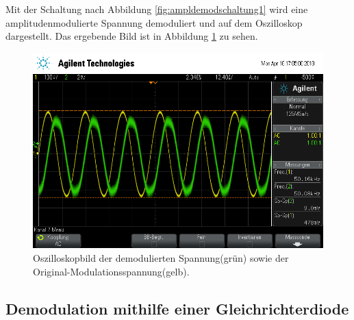 Mit der Schaltung nach Abbildung \ref{fig:ampldemodschaltung1} wird eine amplitudenmodulierte Spannung demoduliert und auf dem Oszilloskop dargestellt. Das ergebende Bild ist in Abbildung \ref{fig:demodRing} zu sehen.

\begin{figure}[h]
  \centering
  \includegraphics[width=.9\textwidth]{Oszi_Pics/demodRing.png}
  \caption{Oszilloskopbild der demodulierten Spannung(grün) sowie der Original-Modulationsspannung(gelb).}
  \label{fig:demodRing}
\end{figure}

\subsection{Demodulation mithilfe einer Gleichrichterdiode}

